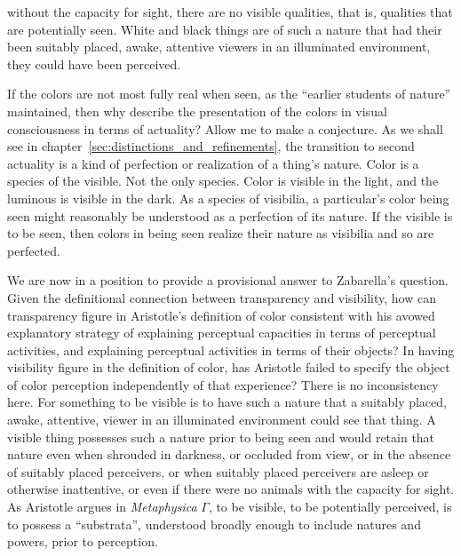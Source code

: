 without the capacity for sight, there are no visible qualities, that is, qualities that are potentially seen. White and black things are of such a nature that had their been suitably placed, awake, attentive viewers in an illuminated environment, they could have been perceived.

If the colors are not most fully real when seen, as the ``earlier students of nature'' maintained, then why describe the presentation of the colors in visual consciousness in terms of actuality? Allow me to make a conjecture. As we shall see in chapter~\ref{sec:distinctions_and_refinements}, the transition to second actuality is a kind of perfection or realization of a thing's nature. Color is a species of the visible. Not the only species. Color is visible in the light, and the luminous is visible in the dark. As a species of visibilia, a particular's color being seen might reasonably be understood as a perfection of its nature. If the visible is to be seen, then colors in being seen realize their nature as visibilia and so are perfected.

We are now in a position to provide a provisional answer to Zabarella's question. Given the definitional connection between transparency and visibility, how can transparency figure in Aristotle's definition of color consistent with his avowed explanatory strategy of explaining perceptual capacities in terms of perceptual activities, and explaining perceptual activities in terms of their objects? In having visibility figure in the definition of color, has Aristotle failed to specify the object of color perception independently of that experience? There is no inconsistency here. For something to be visible is to have such a nature that a suitably placed, awake, attentive, viewer in an illuminated environment could see that thing. A visible thing possesses such a nature prior to being seen and would retain that nature even when shrouded in darkness, or occluded from view, or in the absence of suitably placed perceivers, or when suitably placed perceivers are asleep or otherwise inattentive, or even if there were no animals with the capacity for sight. As Aristotle argues in \emph{Metaphysica} \( \Gamma \), to be visible, to be potentially perceived, is to possess a ``substrata'', understood broadly enough to include natures and powers, prior to perception.

